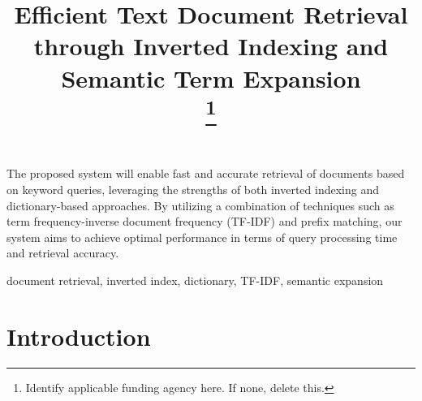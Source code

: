 \documentclass[conference]{IEEEtran}
\begin{document}
\title{Efficient Text Document Retrieval through Inverted Indexing and Semantic Term Expansion\\
\thanks{Identify applicable funding agency here. If none, delete this.}
}

\author{
\and
{}
\and
{}
\and
}

\maketitle

\begin{Abstract}
The proposed system will enable fast and accurate retrieval of documents based on keyword queries, leveraging the strengths of both inverted indexing and dictionary-based approaches. By utilizing a combination of techniques such as term frequency-inverse document frequency (TF-IDF) and prefix matching, our system aims to achieve optimal performance in terms of query processing time and retrieval accuracy.
\end{Abstract}

\begin{IEEEkeywords}
document retrieval, inverted index, dictionary, TF-IDF, semantic expansion
\end{IEEEkeywords}

\section{Introduction}
\end{document}
